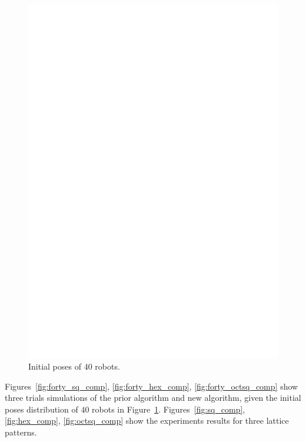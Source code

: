   \begin{figure}
    \centering   
    \includegraphics[scale=0.45]{figs/initSnapshot}
    \caption{Initial poses of $40$ robots.}
    \label{fig:init40}
  \end{figure}
  
Figures~\ref{fig:forty_sq_comp}, \ref{fig:forty_hex_comp}, \ref{fig:forty_octsq_comp} show three trials simulations of the prior algorithm and new algorithm, given the initial poses distribution of $40$ robots in Figure~\ref{fig:init40}. 
%
Figures~\ref{fig:sq_comp}, \ref{fig:hex_comp}, \ref{fig:octsq_comp} show the experiments results for three lattice patterns.

